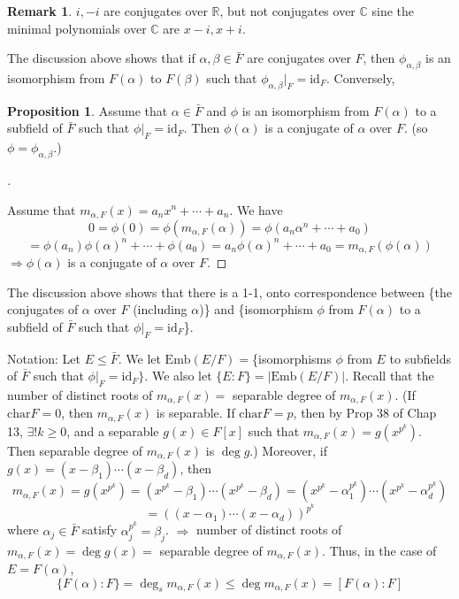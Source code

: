 \documentclass{article}
\theoremstyle{definition}
\newtheorem{rem}{Remark}
\newtheorem{prop}{Proposition}
\newenvironment{proofs}[1][\proofname]{%
  \begin{proof}[#1]$ $\par\nobreak\ignorespaces
}{%
  \end{proof}
}
\begin{document}
\begin{rem}
	$i, -i$ are conjugates over $\mathbb{R}$, but not conjugates over $\mathbb{C}$ sine the minimal polynomials over $\mathbb{C}$ are $x - i, x + i$.
\end{rem}

The discussion above shows that if $\alpha, \beta \in \bar{F}$ are conjugates over $F$, then $\phi_{\alpha, \beta}$ is an isomorphism from $F(\alpha)$ to $F(\beta)$ such that $\phi_{\alpha, \beta}|_F = \text{id}_F$.
Conversely, 

\begin{prop}
	Assume that $\alpha \in \bar{F}$ and $\phi$ is an isomorphism from $F(\alpha)$ to a subfield of $\bar{F}$ such that $\phi|_F = \text{id}_F$.
	Then $\phi(\alpha)$ is a conjugate of $\alpha$ over $F$. (so $\phi = \phi_{\alpha, \beta}$.)
\end{prop}

\begin{proofs}
	Assume that $m_{\alpha, F}(x) = a_n x^n + \cdots + a_n$.
	We have
	\[
		0 = \phi(0) = \phi(m_{\alpha, F}(\alpha)) = \phi(a_n \alpha^n + \cdots + a_0)
	\]
	\[
		= \phi(a_n) \phi(\alpha)^n + \cdots + \phi(a_0) = a_n \phi(\alpha)^n + \cdots + a_0 = m_{\alpha, F}(\phi(\alpha))
	\]
	$\Rightarrow \phi(\alpha)$ is a conjugate of $\alpha$ over $F$.

\end{proofs}

The discussion above shows that there is a 1-1, onto correspondence between \{the conjugates of $\alpha$ over $F$ (including $\alpha$)\} and \{isomorphism $\phi$ from $F(\alpha)$ to a subfield of $\bar{F}$ such that $\phi|_F = \text{id}_F$\}.

\par Notation: Let $E \leq \bar{F}$. We let $\text{Emb}(E/F) =$\{isomorphisms $\phi$ from $E$ to subfields of $\bar{F}$ such that $\phi|_F = \text{id}_F\}$.
We also let $\{E:F\} = |\text{Emb}(E/F)|$.
Recall that the number of distinct roots of $m_{\alpha, F}(x) = $ separable degree of $m_{\alpha, F}(x)$.
(If $\text{char} F = 0$, then $m_{\alpha, F}(x)$ is separable.
If $\text{char} F = p$, then by Prop 38 of Chap 13, $\exists ! k \geq 0$, and a separable $g(x) \in F[x]$ such that $m_{\alpha, F}(x) = g(x^{p^k})$.
Then separable degree of $m_{\alpha, F}(x)$ is $\deg g$.)
Moreover, if $g(x) = (x - \beta_1) \cdots (x - \beta_d)$, then
\[
	m_{\alpha, F}(x) = g(x^{p^k}) = (x^{p^k} - \beta_1) \cdots (x^{p^k} - \beta_d) = (x^{p^k} - \alpha_1^{p^k}) \cdots (x^{p^k} - \alpha_d^{p^k})
\]
\[
	= \left( (x - \alpha_1) \cdots (x - \alpha_d) \right)^{p^k}
\]
where $\alpha_j \in \bar{F}$ satisfy $\alpha_j^{p^k} = \beta_j$.
$\Rightarrow$ number of distinct roots of $m_{\alpha, F}(x) = \deg g(x) =$ separable degree of $m_{\alpha, F}(x)$.
Thus, in the case of $E = F(\alpha)$, 
\[
	\{F(\alpha):F\} = \deg_s m_{\alpha, F}(x) \leq \deg m_{\alpha, F}(x) = [F(\alpha):F]
\]
\end{document}
